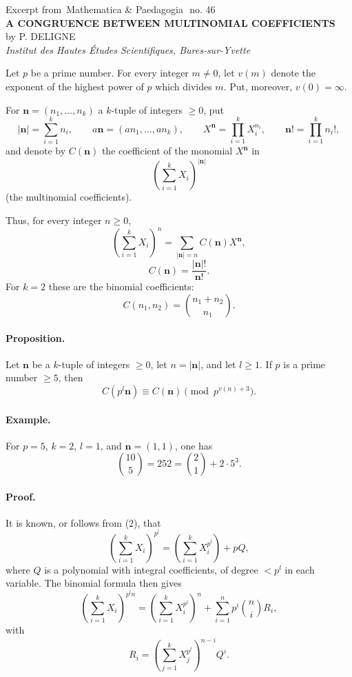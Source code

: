\documentclass[10pt]{article}
\newcommand{\og}{\guillemotleft\,}
\newcommand{\fg}{\,\guillemotright}
\newcommand{\nn}{\mathbf n}
\begin{document}
\begin{center}
{\large Excerpt from \og Mathematica \& Paedagogia\fg\ no. 46}\\[2.4em]
{\Large\bfseries A CONGRUENCE BETWEEN MULTINOMIAL COEFFICIENTS}\\[1.0em]
by P. DELIGNE\\
{\itshape Institut des Hautes Études Scientifiques, Bures-sur-Yvette}
\end{center}

\medskip

Let $p$ be a prime number. For every integer $m\ne0$, let $v(m)$ denote the exponent of the highest power of $p$ which divides $m$. Put, moreover, $v(0)=\infty$.

For $\nn=(n_1,\ldots,n_k)$ a $k$-tuple of integers $\ge0$, put
\[
|\nn|=\sum_{i=1}^k n_i,\qquad
a\nn=(an_1,\ldots,an_k),\qquad
X^\nn=\prod_{i=1}^k X_i^{n_i},\qquad
\nn! = \prod_{i=1}^k n_i!,
\]
and denote by $C(\nn)$ the coefficient of the monomial $X^\nn$ in
\[
\left(\sum_{i=1}^k X_i\right)^{|\nn|}
\]
(the multinomial coefficients).

Thus, for every integer $n\ge0$,
\[
\left(\sum_{i=1}^k X_i\right)^n
=\sum_{|\nn|=n} C(\nn)X^\nn, \tag{1}
\]
\[
C(\nn)=\frac{|\nn|!}{\nn!}. \tag{2}
\]
For $k=2$ these are the binomial coefficients:
\[
C(n_1,n_2)=\binom{n_1+n_2}{n_1}. \tag{3}
\]

\paragraph{Proposition.} Let $\nn$ be a $k$-tuple of integers $\ge0$, let $n=|\nn|$, and let $l\ge1$. If $p$ is a prime number $\ge5$, then
\[
C(p^l\nn)\equiv C(\nn)\pmod {p^{v(n)+3}}. \tag{4}
\]

\paragraph{Example.} For $p=5$, $k=2$, $l=1$, and $\nn=(1,1)$, one has
\[
\binom{10}{5}=252=\binom21+2\cdot5^3.
\]

\paragraph{Proof.} It is known, or follows from (2), that
\[
\left(\sum_{i=1}^k X_i\right)^{p^l}
=
\left(\sum_{i=1}^k X_i^{p^l}\right)+pQ, \tag{5}
\]
where $Q$ is a polynomial with integral coefficients, of degree $<p^l$ in each variable. The binomial formula then gives
\[
\left(\sum_{i=1}^k X_i\right)^{p^l n}
=
\left(\sum_{i=1}^k X_i^{p^l}\right)^n
+\sum_{i=1}^n p^i\binom ni R_i, \tag{6}
\]
with
\[
R_i=
\left(\sum_{j=1}^k X_j^{p^l}\right)^{n-i}Q^i. \tag{7}
\]
\end{document}
